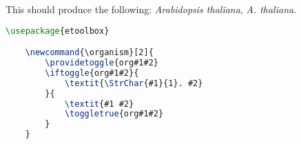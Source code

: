 This should produce the following: \textit{Arabidopsis thaliana}, \textit{A.
thaliana}.

\begin{solution}
	\begin{lstlisting}[language=TeX]
	\usepackage{etoolbox}

	\newcommand{\organism}[2]{
		\providetoggle{org#1#2}
		\iftoggle{org#1#2}{
			\textit{\StrChar{#1}{1}. #2}
		}{
			\textit{#1 #2}
			\toggletrue{org#1#2}
		}
	}
	\end{lstlisting}
\end{solution}
